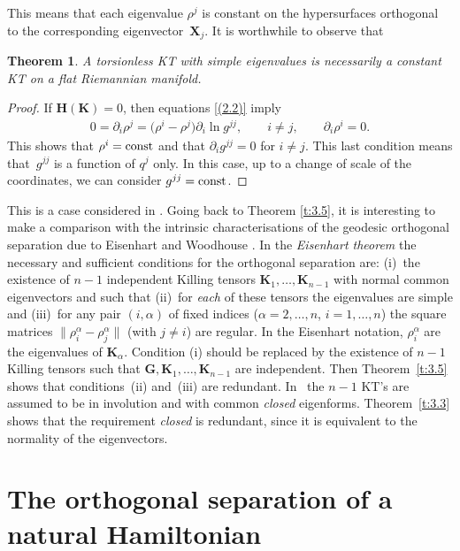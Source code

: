 \documentclass[10pt,a4paper]{amsart}
\def\bs{\boldsymbol}
\numberwithin{equation}{section}
\newtheorem{Theorem}{Theorem}[section]
 { \theoremstyle{definition}
\newtheorem{Notation}[Theorem]{Notation}
\newtheorem{Example}[Theorem]{Example}
\newtheorem{Remark}[Theorem]{Remark}
\newtheorem{Remarks}[Theorem]{Remarks}
 }
\begin{document}
This means that each eigenvalue $\rho^j$ is constant on the hypersurfaces orthogonal to the corresponding eigenvector~$\bs X_j$. It is worthwhile to observe that

\begin{Theorem}
A torsionless KT with simple eigenvalues is necessarily a constant KT on a flat Riemannian manifold.
\end{Theorem}

\begin{proof}
If $\bs H(\bs K)=0$, then equations \eqref{(2.2)} imply
\begin{gather*}
0=\partial_i\rho^j=\big(\rho^i-\rho^j\big) \partial_i\ln g^{jj},\qquad i\neq j, \qquad \partial_i\rho^i=0.
\end{gather*}
This shows that $\rho^i={\rm const}$ and that $\partial_ig^{jj}=0$ for $i\neq j$. This last condition means that~$g^{jj}$ is a function of $q^j$ only. In this case, up to a change of scale of the coordinates, we can consider $g^{jj}={\rm const}$.
\end{proof}

This is a case considered in \cite{Bruce-McL-Smirnov-2001}. Going back to Theorem \ref{t:3.5}, it is interesting to make a comparison with the intrinsic characterisations of the geodesic orthogonal separation due to Eisenhart \cite{Eisenhart-1934,Eisenhart-1949} and Woodhouse \cite{Woodhouse-1975}. In the {\it Eisenhart theorem} \cite[p.~289]{Eisenhart-1934} the necessary and suf\/f\/icient conditions for the orthogonal separation are: (i)~the existence of $n-1$ independent Killing tensors $\bs K_1,\ldots, \bs K_{n-1}$ with normal common eigenvectors and such that (ii)~for {\it each} of these tensors the eigenvalues are simple and (iii)~for any pair $(i,\alpha)$ of f\/ixed indices ($\alpha =2,\ldots, n$, $i=1,\ldots, n$) the square matrices $\|\rho_i^\alpha-\rho_j^\alpha\|$ (with $j\neq i$) are regular. In the Eisenhart notation, $\rho_i^\alpha$ are the eigenvalues of $\bs K_\alpha$. Condition (i) should be replaced by the existence of $n-1$ Killing tensors such that $\bs G,\bs K_1,\ldots, \bs K_{n-1}$ are independent. Then Theorem~\ref{t:3.5} shows that conditions~(ii) and~(iii) are redundant. In~\cite[Theorem~4.2]{Woodhouse-1975} the $n-1$ KT's are assumed to be in involution and with common {\it closed} eigenforms. Theorem~\ref{t:3.3} shows that the requirement {\it closed} is redundant, since it is equivalent to the normality of the eigenvectors.

\section{The orthogonal separation of a natural Hamiltonian}\label{section4}
\end{document}
